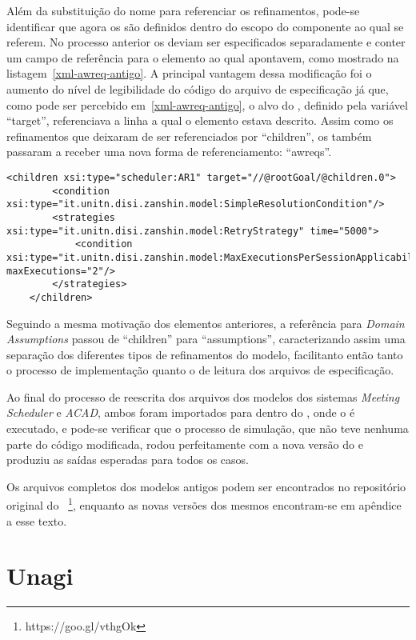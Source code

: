 Além da substituição do nome para referenciar os refinamentos, pode-se identificar que agora os \awreqs são definidos dentro do escopo do componente ao qual se referem. No processo anterior os \awreqs deviam ser especificados separadamente e conter um campo de referência para o elemento ao qual apontavem, como mostrado na listagem~\ref{xml-awreq-antigo}. A principal vantagem dessa modificação foi o aumento do nível de legibilidade do código do arquivo de especificação já que, como pode ser percebido em~\ref{xml-awreq-antigo}, o alvo do \awreq, definido pela variável ``target'', referenciava a linha a qual o elemento estava descrito. Assim como os refinamentos que deixaram de ser referenciados por ``children'', os \awreqs também passaram a receber uma nova forma de referenciamento: ``awreqs''.
 
\begin{lstlisting}[caption={Trecho de XML representando o ACAD no novo metamodelo},label={xml-refinements}]
	<children xsi:type="scheduler:AR1" target="//@rootGoal/@children.0">
		<condition xsi:type="it.unitn.disi.zanshin.model:SimpleResolutionCondition"/>
		<strategies xsi:type="it.unitn.disi.zanshin.model:RetryStrategy" time="5000">
			<condition xsi:type="it.unitn.disi.zanshin.model:MaxExecutionsPerSessionApplicabilityCondition" maxExecutions="2"/>
		</strategies>
	</children>
\end{lstlisting}

Seguindo a mesma motivação dos elementos anteriores, a referência para \textit{Domain Assumptions} passou de ``children'' para ``assumptions'', caracterizando assim uma separação dos diferentes tipos de refinamentos do modelo, facilitanto então tanto o processo de implementação quanto o de leitura dos arquivos de especificação. 

Ao final do processo de reescrita dos arquivos dos modelos dos sistemas \textit{Meeting Scheduler} e \textit{ACAD}, ambos foram importados para dentro do \eclipse, onde o \zanshin é executado, e pode-se verificar que o processo de simulação, que não teve nenhuma parte do código modificada, rodou perfeitamente com a nova versão do \zanshin e produziu as saídas esperadas para todos os casos.

Os arquivos completos dos modelos antigos podem ser encontrados no repositório original do \framework~\footnote{https://goo.gl/vthgOk}, enquanto as novas versões dos mesmos encontram-se em apêndice a esse texto.

\section{Unagi}

